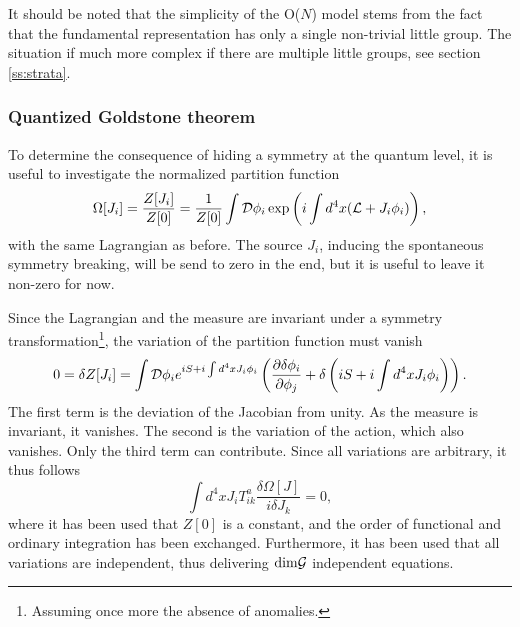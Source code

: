 \documentclass[final,12pt,3p,longtitle]{elsarticle}
\newcommand*{\La}{{\cal{L}}}
\newcommand*{\no}{\noindent}
\newcommand*{\be}{\begin{equation}}
\newcommand*{\ee}{\end{equation}}
\newcommand*{\pd}{\partial}
\newcommand*{\nn}{\nonumber}
\newcommand*{\1}{1\!\!\!\bot}
\begin{document}
It should be noted that the simplicity of the O($N$) model stems from the fact that the fundamental representation has only a single non-trivial little group. The situation if much more complex if there are multiple little groups, see section \ref{ss:strata}.%

\subsubsection{Quantized Goldstone theorem}\label{ss:qgoldstone}

To determine the consequence of hiding a symmetry at the quantum level, it is useful to investigate the normalized partition function
\be
\Omega[J_i]=\frac{Z[J_i]}{Z[0]}=\frac{1}{Z[0]}\int{\cal D}\phi_i\exp\left(i\int d^4x(\La+J_i\phi_i)\right)\nn,
\ee
\no with the same Lagrangian as before. The source $J_i$, inducing the spontaneous symmetry breaking, will be send to zero in the end, but it is useful to leave it non-zero for now.

Since the Lagrangian and the measure are invariant under a symmetry transformation\footnote{Assuming once more the absence of anomalies.}, the variation of the partition function must vanish
\be
0=\delta Z[J_i]=\int {\cal D}\phi_i e^{iS+i\int d^4 xJ_i\phi_i}\left(\frac{\pd\delta\phi_i}{\pd\phi_j}+\delta\left(iS+i \int d^4xJ_i\phi_i\right)\right)\nn.
\ee
\no The first term is the deviation of the Jacobian from unity. As the measure is invariant, it vanishes. The second is the variation of the action, which also vanishes. Only the third term can contribute. Since all variations are arbitrary, it thus follows
\be
\int d^4x J_i T_{ik}^a\frac{\delta \Omega[J]}{i\delta J_k}=0\nn,
\ee
\no where it has been used that $Z[0]$ is a constant, and the order of functional and ordinary integration has been exchanged. Furthermore, it has been used that all variations are independent, thus delivering $\mathrm{dim}{\cal G}$ independent equations.
\end{document}
